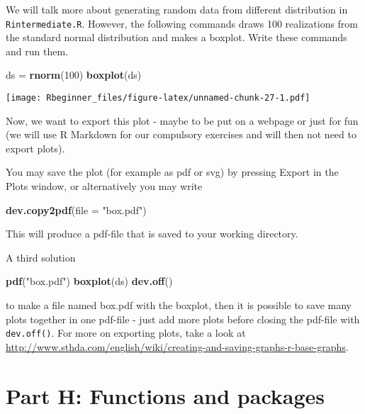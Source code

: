 \documentclass[]{article}
\newenvironment{Shaded}{\begin{snugshade}}{\end{snugshade}}
\newcommand{\KeywordTok}[1]{\textcolor[rgb]{0.13,0.29,0.53}{\textbf{#1}}}
\newcommand{\DataTypeTok}[1]{\textcolor[rgb]{0.13,0.29,0.53}{#1}}
\newcommand{\DecValTok}[1]{\textcolor[rgb]{0.00,0.00,0.81}{#1}}
\newcommand{\StringTok}[1]{\textcolor[rgb]{0.31,0.60,0.02}{#1}}
\newcommand{\NormalTok}[1]{#1}
\begin{document}
We will talk more about generating random data from different
distribution in \texttt{Rintermediate.R}. However, the following
commands draws 100 realizations from the standard normal distribution
and makes a boxplot. Write these commands and run them.

\begin{Shaded}
\begin{Highlighting}[]
\NormalTok{ds =}\StringTok{ }\KeywordTok{rnorm}\NormalTok{(}\DecValTok{100}\NormalTok{)}
\KeywordTok{boxplot}\NormalTok{(ds)}
\end{Highlighting}
\end{Shaded}

\texttt{[image: Rbeginner\_files/figure-latex/unnamed-chunk-27-1.pdf]}

Now, we want to export this plot - maybe to be put on a webpage or just
for fun (we will use R Markdown for our compulsory exercises and will
then not need to export plots).

You may save the plot (for example as pdf or svg) by pressing Export in
the Plots window, or alternatively you may write

\begin{Shaded}
\begin{Highlighting}[]
\KeywordTok{dev.copy2pdf}\NormalTok{(}\DataTypeTok{file =} \StringTok{"box.pdf"}\NormalTok{)}
\end{Highlighting}
\end{Shaded}

This will produce a pdf-file that is saved to your working directory.

A third solution

\begin{Shaded}
\begin{Highlighting}[]
\KeywordTok{pdf}\NormalTok{(}\StringTok{"box.pdf"}\NormalTok{)}
\KeywordTok{boxplot}\NormalTok{(ds)}
\KeywordTok{dev.off}\NormalTok{()}
\end{Highlighting}
\end{Shaded}

to make a file named box.pdf with the boxplot, then it is possible to
save many plots together in one pdf-file - just add more plots before
closing the pdf-file with \texttt{dev.off()}. For more on exporting
plots, take a look at
\url{http://www.sthda.com/english/wiki/creating-and-saving-graphs-r-base-graphs}.

\section{Part H: Functions and
packages}\label{part-h-functions-and-packages}
\end{document}
